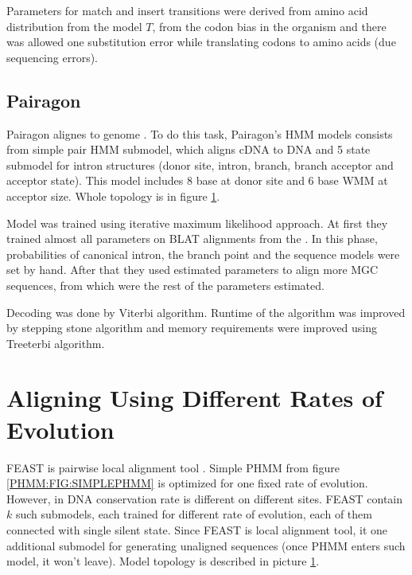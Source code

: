 Parameters for match and insert transitions were derived from amino acid
distribution from the model $T$, from the codon bias in the organism and there
was allowed one substitution error while translating codons to amino acids (due
sequencing errors).
  
\subsection{Pairagon}

Pairagon alignes  to  genome \cite{Pairagon2009}.
To do this task, Pairagon's HMM models consists from simple pair HMM submodel,
which aligns cDNA to DNA and 5 state submodel for intron structures (donor site,
intron, branch, branch acceptor and acceptor state). This model includes 8 base
 at donor site and 6 base WMM at
acceptor size. Whole topology is in figure \ref{}.

Model was trained using iterative maximum likelihood approach. At first they
trained almost all parameters on BLAT alignments from the
. In this phase, probabilities of
canonical intron, the branch point and the sequence models were set by hand.
After that they used estimated parameters to align more MGC sequences, from
which were the rest of the parameters estimated.

Decoding was done by Viterbi algorithm. Runtime of the algorithm was improved by
stepping stone algorithm \cite{} and memory requirements were improved using
Treeterbi algorithm. 

\section{Aligning Using Different Rates of Evolution}
 
FEAST is pairwise local alignment tool \cite{FEAST2011}. Simple PHMM from figure
\ref{PHMM:FIG:SIMPLEPHMM} is optimized for one fixed rate of evolution. However,
in DNA conservation rate is different on different sites.  FEAST contain $k$
such submodels, each trained for different rate of evolution, each of them
connected with single silent state. Since FEAST is local alignment tool, it one
additional submodel for generating unaligned sequences (once PHMM enters such
model, it won't leave). Model topology is described in picture \ref{}.

